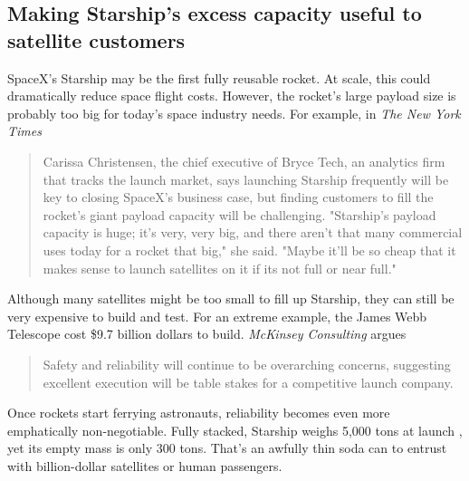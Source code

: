 \documentclass{article}
\begin{document}
{\subsection{Making Starship's excess capacity useful to satellite customers}
SpaceX's Starship may be the first fully reusable rocket. At scale, this could dramatically reduce space flight costs.   However, the rocket's large payload size is probably too big for today's space industry needs. For example, in \textit{The New York Times}
\begin{quote}
Carissa Christensen, the chief executive of Bryce Tech, an analytics firm that tracks the launch market, says launching Starship frequently will be key to closing SpaceX’s business case, but finding customers to fill the rocket’s giant payload capacity will be challenging. 
"Starship's payload capacity is huge; it's very, very big, and there aren't that many commercial uses today for a rocket that big," she said.  "Maybe it'll be so cheap that it makes sense to launch satellites on it if its not full or near full."  \cite{nyt_starship_size}
\end{quote}
Although many satellites might be too small to fill up Starship, they can still be very expensive to build and test. For an extreme example, the James Webb Telescope \cite{james_webb_space_telescope} cost \$9.7 billion dollars \cite{jwst_cost} to build. \textit{McKinsey Consulting} argues 
\begin{quote}
Safety and reliability will continue to be overarching concerns, suggesting excellent execution will be table stakes for a competitive launch company. \cite{mckinsey_reliability}
\end{quote}
Once rockets start ferrying astronauts, reliability becomes even more emphatically non-negotiable. Fully stacked, Starship weighs 5,000 tons at launch \cite{starship}, yet its empty mass is only 300 tons. That’s an awfully thin soda can to entrust with billion-dollar satellites or human passengers.

}
\end{document}
